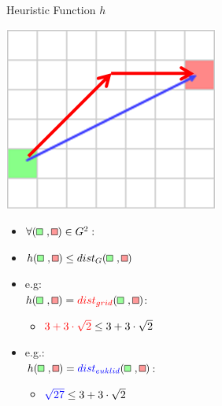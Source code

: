 \documentclass{presentation}
\newcommand{\rect}[1]{\tikz{\path[draw=black,fill=#1] (0,0) rectangle (2mm,2mm);}}
\newcommand{\grect}{\rect{white!60!green}}
\newcommand{\rrect}{\rect{white!60!red}}
\begin{document}
\begin{frame}{Heuristic Function $h$}
	\begin{minipage}{0.3\textwidth}
		\includegraphics[width=\textwidth]{figures/heuristic.png}
	\end{minipage}%
	\hfill%
	\begin{minipage}{0.6\textwidth}
		\begin{itemize}
		\item $\forall (\grect\ , \rrect)\in G^2:$
		\item $h(\grect\ , \rrect)\leq dist_{G}(\grect\ ,\rrect)$
		\pause
		\item e.g:\\ $h(\grect\ , \rrect) = {\color{red}dist_{grid}}(\grect\ ,\rrect)$:
		\begin{itemize}
			\item ${\color{red}3+3\cdot\sqrt{2}}\leq 3+3\cdot\sqrt{2}$
		\end{itemize}
		\pause
		\item e.g.:\\ $h(\grect\ , \rrect) = {\color{blue}dist_{euklid}}(\grect\ ,\rrect)$:
		\begin{itemize}
			\item ${\color{blue}\sqrt{27}} \leq 3+3\cdot\sqrt{2}$
		\end{itemize}
		\end{itemize}
	\end{minipage}
\end{frame}
\end{document}
